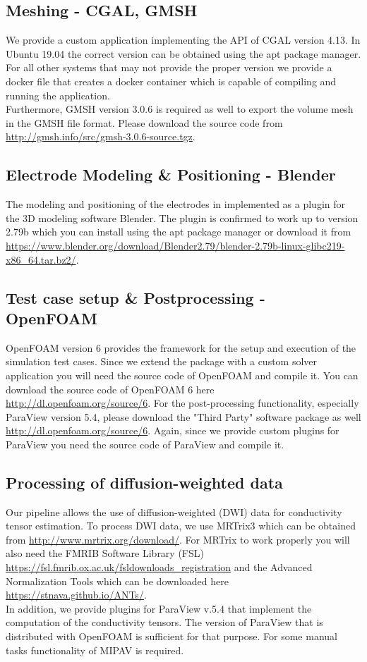\subsection{Meshing - CGAL, GMSH}
We provide a custom application implementing the API of CGAL version 4.13. In Ubuntu 19.04 the correct version can be obtained
using the apt package manager. For all other systems that may not provide the proper version we provide a docker file that creates
a docker container which is capable of compiling and running the application.\\
Furthermore, GMSH version 3.0.6 is required as well to export the volume mesh in the GMSH file format. Please download the source
code from \url{http://gmsh.info/src/gmsh-3.0.6-source.tgz}. 

\subsection{Electrode Modeling \& Positioning - Blender}
The modeling and positioning of the electrodes in implemented as a plugin for the 3D modeling software Blender. The plugin is
confirmed to work up to version 2.79b which you can install using the apt package manager or download it from 
\url{https://www.blender.org/download/Blender2.79/blender-2.79b-linux-glibc219-x86\_64.tar.bz2/}.

\subsection{Test case setup \& Postprocessing - OpenFOAM}
OpenFOAM version 6 provides the framework for the setup and execution of the simulation test cases. Since we extend the package
with a custom solver application you will need the source code of OpenFOAM and compile it. You can download the source code of
OpenFOAM 6 here \url{http://dl.openfoam.org/source/6}. For the post-processing functionality, especially ParaView version 5.4,
please download the "Third Party" software package as well \url{http://dl.openfoam.org/source/6}. Again, since we provide
custom plugins for ParaView you need the source code of ParaView and compile it.

\subsection{Processing of diffusion-weighted data}
Our pipeline allows the use of diffusion-weighted (DWI) data for conductivity tensor estimation. To process DWI data, we use
MRTrix3 which can be obtained from \url{http://www.mrtrix.org/download/}. For MRTrix to work properly you will also need
the FMRIB Software Library (FSL) \url{https://fsl.fmrib.ox.ac.uk/fsldownloads\_registration} and the Advanced Normalization Tools
which can be downloaded here \url{https://stnava.github.io/ANTs/}.\\
In addition, we provide plugins for ParaView v.5.4 that implement the computation of the conductivity tensors. The version of
ParaView that is distributed with OpenFOAM is sufficient for that purpose. For some manual tasks functionality of MIPAV is required.


